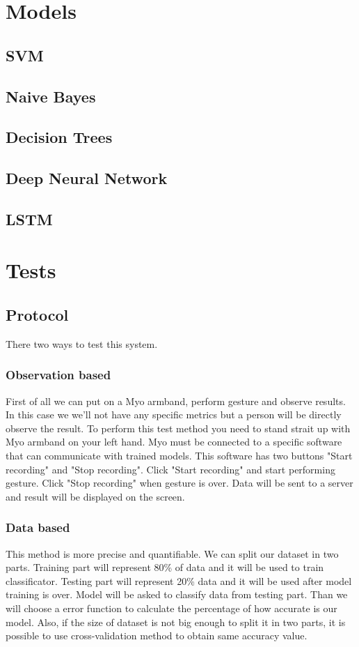 \documentclass[conference,compsoc]{IEEEtran}
\begin{document}
\section{Models}
\subsection{SVM}
\subsection{Naive Bayes}
\subsection{Decision Trees}
\subsection{Deep Neural Network}
\subsection{LSTM}

\section{Tests}
\subsection{Protocol}
There two ways to test this system.
\subsubsection{Observation based}
 First of all we can put on a Myo armband, perform gesture and observe results. In this case we we'll not have any specific metrics but a person will be directly observe the result.
To perform this test method you need to stand strait up with Myo armband on your left hand. Myo must be connected to a specific software that can communicate with trained models. This software has two buttons "Start recording" and "Stop recording". Click "Start recording" and start performing gesture. Click "Stop recording" when gesture is over. Data will be sent to a server and result will be displayed on the screen.
\subsubsection{Data based}
This method is more precise and quantifiable. We can split our dataset in two parts. Training part will represent 80\% of data and it will be used to train classificator. Testing part will represent 20\% data and it will be used after model training is over. Model will be asked to classify data from testing part. Than we will choose a error function to calculate the percentage of how accurate is our model. Also, if the size of dataset is not big enough to split it in two parts, it is possible to use cross-validation method to obtain same accuracy value.
\end{document}
